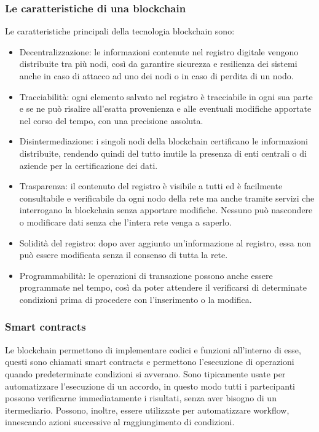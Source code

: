 \documentclass[a4paper]{article}
\begin{document}
    \subsubsection{Le caratteristiche di una blockchain}
    Le caratteristiche principali della tecnologia blockchain sono:
    \begin{itemize}
      \item Decentralizzazione: le informazioni contenute nel registro digitale vengono distribuite tra più nodi, così da garantire sicurezza e resilienza dei sistemi anche in caso di attacco ad uno dei nodi o in caso di perdita di un nodo.
      \item Tracciabilità: ogni elemento salvato nel registro è tracciabile in ogni sua parte e se ne può risalire all’esatta provenienza e alle eventuali modifiche apportate nel corso del tempo, con una precisione assoluta.
      \item Disintermediazione: i singoli nodi della blockchain certificano le informazioni distribuite, rendendo quindi del tutto inutile la presenza di enti centrali o di aziende per la certificazione dei dati.
      \item Trasparenza: il contenuto del registro è visibile a tutti ed è facilmente consultabile e verificabile da ogni nodo della rete ma anche tramite servizi che interrogano la blockchain senza apportare modifiche. Nessuno può nascondere o modificare dati senza che l'intera rete venga a saperlo.
      \item Solidità del registro: dopo aver aggiunto un'informazione al registro, essa non può essere modificata senza il consenso di tutta la rete.
      \item Programmabilità: le operazioni di transazione possono anche essere programmate nel tempo, così da poter attendere il verificarsi di determinate condizioni prima di procedere con l'inserimento o la modifica.\cite{blockchain1}
    \end{itemize}
    \subsubsection{Smart contracts}
    Le blockchain permettono di implementare codici e funzioni all'interno di esse, questi sono chiamati smart contracts e permettono l'esecuzione di operazioni quando predeterminate condizioni si avverano.
    Sono tipicamente usate per automatizzare l'esecuzione di un accordo, in questo modo tutti i partecipanti possono verificarne immediatamente i risultati, senza aver bisogno di un itermediario.
    Possono, inoltre, essere utilizzate per automatizzare workflow, innescando azioni successive al raggiungimento di condizioni.\cite{smartcontracts}
\end{document}
